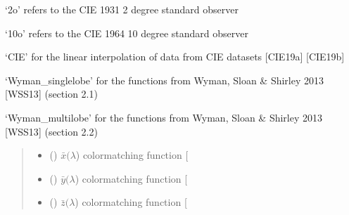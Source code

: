 \documentclass[letterpaper,10pt,english]{sphinxmanual}
\begin{document}
\begin{fulllineitems}
\begin{quote}
\begin{description}
\end{description}\end{quote}

\begin{DUlineblock}{0em}
\item[] ‘2o’ refers to the CIE 1931 2 degree standard observer
\item[] ‘10o’ refers to the CIE 1964 10 degree standard observer
\end{DUlineblock}

\begin{DUlineblock}{0em}
\item[] ‘CIE’ for the linear interpolation of data from CIE datasets {[}CIE19a{]} {[}CIE19b{]}
\item[] ‘Wyman\_singlelobe’ for the functions from Wyman, Sloan \& Shirley 2013 {[}WSS13{]} (section 2.1)
\item[] ‘Wyman\_multilobe’ for the functions from Wyman, Sloan \& Shirley 2013 {[}WSS13{]} (section 2.2)
\end{DUlineblock}
\begin{quote}\begin{description}
\sphinxAtStartPar
\begin{itemize}
\item {} 
\sphinxAtStartPar
{} () \textendash{} \(\bar{x}(\lambda\)) color\sphinxhyphen{}matching function {[}\sphinxhyphen{}{]}

\item {} 
\sphinxAtStartPar
{} () \textendash{} \(\bar{y}(\lambda\)) color\sphinxhyphen{}matching function {[}\sphinxhyphen{}{]}

\item {} 
\sphinxAtStartPar
{} () \textendash{} \(\bar{z}(\lambda\)) color\sphinxhyphen{}matching function {[}\sphinxhyphen{}{]}

\end{itemize}


\end{description}\end{quote}

\end{fulllineitems}

\end{document}
